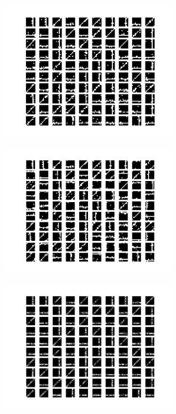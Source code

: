 \begin{figure}[h!]
	\centering
	\begin{subfigure}[t]{.49\textwidth}
  		\centering
  		\includegraphics[width=.9\linewidth]{imgs/stripes1.png}
  		\caption{}
  		\label{fig:stripes1}
	\end{subfigure}%
	\begin{subfigure}[t]{.49\textwidth}
  		\centering
  		\includegraphics[width=.9\linewidth]{imgs/stripes2.png}
  		\caption{}
  		\label{fig:stripes2}
	\end{subfigure}
	\begin{subfigure}[t]{.49\textwidth}
  		\centering
  		\includegraphics[width=.9\linewidth]{imgs/stripes3.png}

\end{subfigure}
\end{figure}
